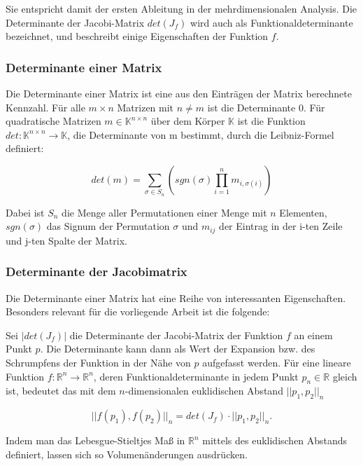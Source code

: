 \documentclass[a4paper,fontsize=12pt,toc=bib,parskip=half,ngerman]{scrartcl}
\begin{document}
Sie entspricht damit der ersten Ableitung in der mehrdimensionalen Analysis. Die Determinante der Jacobi-Matrix $det(J_f)$ wird auch als Funktionaldeterminante bezeichnet, und beschreibt einige Eigenschaften der Funktion $f$. 

\subsubsection{Determinante einer Matrix}
Die Determinante einer Matrix ist eine aus den Eintr\"agen der Matrix berechnete Kennzahl. F\"ur alle $m\times n$ Matrizen mit $n \neq m$ ist die Determinante 0. F\"ur quadratische Matrizen $m \in \mathbb{K}^{n\times n}$ \"uber dem K\"orper $\mathbb{K}$ ist die Funktion $det: \mathbb{K}^{n\times n} \rightarrow \mathbb{K}$, die Determinante von m bestimmt, durch die Leibniz-Formel definiert:

\begin{equation}
	det(m) = \sum_{\sigma \in S_n} \left( sgn(\sigma) \prod_{i=1}^{n} m_{i,\sigma(i)}\right)
\end{equation}

Dabei ist $S_n$ die Menge aller Permutationen einer Menge mit $n$ Elementen, $sgn(\sigma)$ das Signum der Permutation $\sigma$ und $m_{ij}$ der Eintrag in der i-ten Zeile und j-ten Spalte der Matrix.

\subsubsection{Determinante der Jacobimatrix}
Die Determinante einer Matrix hat eine Reihe von interessanten Eigenschaften. Besonders relevant f\"ur die vorliegende Arbeit ist die folgende:

Sei $|det(J_f)|$ die Determinante der Jacobi-Matrix der Funktion $f$ an einem Punkt $p$. Die Determinante kann dann als Wert der Expansion bzw. des Schrumpfens der Funktion in der N\"ahe von $p$ aufgefasst werden. F\"ur eine lineare Funktion $f: \mathbb{R}^n\rightarrow \mathbb{R}^n$, deren Funktionaldeterminante in jedem Punkt $p_n \in \mathbb{R}$ gleich ist, bedeutet das mit dem $n$-dimensionalen euklidischen Abstand $||p_1, p_2||_n$

\begin{equation}
||f(p_1), f(p_2)||_n = det(J_f)\cdot||p_1, p_2||_n.
\end{equation}

Indem man das Lebesgue-Stieltjes Ma{\ss} in $\mathbb{R}^n$ mittels des euklidischen Abstands definiert, lassen sich so Volumen\"anderungen ausdr\"ucken.
\end{document}

